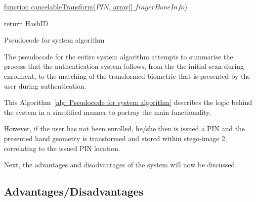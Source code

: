 
\begin{algorithm}
     
     \underline{function cancelableTransform($PIN$, array[] $fingerBoneInfo$)}\;
     
        
      return HashID\;
     \caption{Pseudocode for system algorithm}
     \label{alg: Pseudocode for system algorithm}
     
\end{algorithm}



The pseudocode for the entire system algorithm attempts to summarise the process that the authentication system follows, from the the initial scan during enrolment, to the matching of the transformed biometric that is presented by the user during authentication. 

This Algorithm~\ref{alg: Pseudocode for system algorithm} describes the logic behind the system in a simplified manner to portray the main functionality. 



However, if the user has not been enrolled, he/she then is issued a PIN and the presented hand geometry is transformed and stored within stego-image 2, correlating to the issued PIN location.

Next, the advantages and disadvantages of the system will now be discussed.

\subsection{Advantages/Disadvantages}

